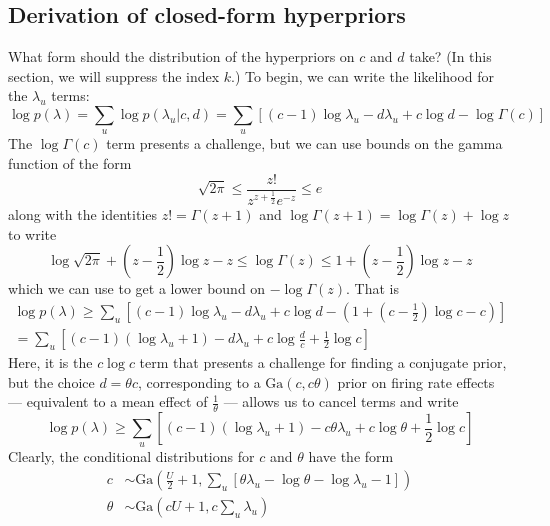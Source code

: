 \documentclass[11pt]{article}
\begin{document}
\subsection{Derivation of closed-form hyperpriors}
What form should the distribution of the hyperpriors on $c$ and $d$ take? (In this section, we will suppress the index $k$.) To begin, we can write the likelihood for the $\lambda_u$ terms:
\begin{equation}
    \log p(\lambda) = \sum_u \log p(\lambda_u|c, d) = \sum_u \left[ 
    (c - 1) \log \lambda_u - d\lambda_u + c \log d - \log \Gamma(c) 
    \right]
\end{equation}
The $\log \Gamma(c)$ term presents a challenge, but we can use bounds on the gamma function of the form
\begin{equation}
    \sqrt{2\pi} \le \frac{z!}{z^{z+\frac{1}{2}} e^{-z}} \le e
\end{equation}
along with the identities $z! = \Gamma(z + 1)$ and $\log \Gamma(z + 1) = \log \Gamma (z) + \log z$ to write
\begin{equation}
    \log \sqrt{2\pi} + \left(z - \frac{1}{2}\right)\log z - z \le
    \log \Gamma (z) \le 1 + \left(z - \frac{1}{2}\right) \log z - z
\end{equation}
which we can use to get a lower bound on $-\log \Gamma (z)$. That is
\begin{multline}
    \log p(\lambda) \ge \sum_u \left[ 
    (c - 1) \log \lambda_u - d\lambda_u + c \log d - 
    \left(1 + \left(c - \frac{1}{2}\right) \log c - c\right)
    \right] \\
    = \sum_u \left[
    (c - 1) (\log \lambda_u + 1) - d\lambda_u + c \log \frac{d}{c} + 
    \frac{1}{2} \log c
    \right] 
\end{multline}
Here, it is the $c\log c$ term that presents a challenge for finding a conjugate prior, but the choice $d = \theta c$, corresponding to a $\mathrm{Ga}(c, c\theta)$ prior on firing rate effects --- equivalent to a mean effect of $\frac{1}{\theta}$ --- allows us to cancel terms and write
\begin{equation}
    \log p(\lambda) \ge \sum_u \left[ 
    (c - 1) (\log \lambda_u + 1) - c\theta\lambda_u + c \log \theta + \frac{1}{2}\log c\right]
\end{equation}
Clearly, the conditional distributions for $c$ and $\theta$ have the form 
\begin{align}
    c &\sim \mathrm{Ga}\left(\frac{U}{2} + 1, \sum_u \left[ 
    \theta\lambda_{u} - \log \theta - \log \lambda_{u} - 1
    \right]\right) \\
    \theta &\sim \mathrm{Ga}\left(
    cU + 1, c \sum_u \lambda_u
    \right)
\end{align}
\end{document}
